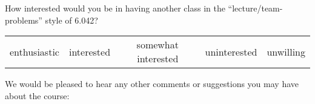 \documentclass[handout]{mcs}
\begin{document}
How interested would you be in having another class in the
``lecture/team-problems'' style of 6.042?
\begin{center}
\begin{tabular}{ccccc}
enthusiastic &  interested &  somewhat interested  &  uninterested &  unwilling
\end{tabular}
\end{center}

\vspace{0.5in}
We would be pleased to hear any other comments or suggestions you may have
about the course:

\textbox{\hspace{7in}
\vspace{6in}}
\end{document}
